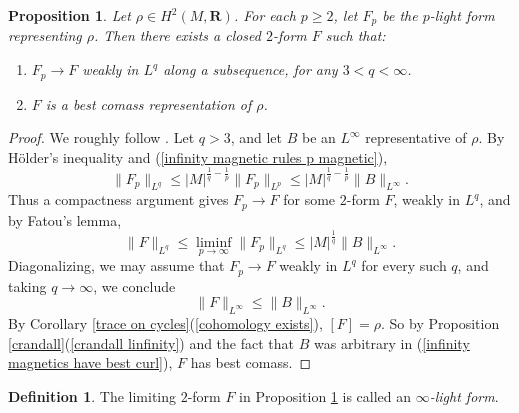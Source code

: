 \documentclass[reqno,11pt]{amsart}
\newcommand{\RR}{\mathbf{R}}
\newcommand{\dfn}[1]{\emph{#1}\index{#1}}
\newtheorem{proposition}[theorem]{Proposition}
\theoremstyle{definition}
\newtheorem{definition}[theorem]{Definition}
\numberwithin{equation}{section}
\begin{document}
\begin{proposition}\label{existence infinity}
Let $\rho \in H^2(M, \RR)$.
For each $p \geq 2$, let $F_p$ be the $p$-light form representing $\rho$. Then there exists a closed $2$-form $F$ such that:
\begin{enumerate}
\item $F_p \to F$ weakly in $L^q$ along a subsequence, for any $3 < q < \infty$.
\item $F$ is a best comass representation of $\rho$.
\end{enumerate}
\end{proposition}
\begin{proof}
We roughly follow \cite[\S3]{Lindqvist14}.
Let $q > 3$, and let $B$ be an $L^\infty$ representative of $\rho$.
By H\"older's inequality and (\ref{infinity magnetic rules p magnetic}),
\begin{equation}\label{uniform bounds in p by best curl}
	\|F_p\|_{L^q} \leq |M|^{\frac{1}{q} - \frac{1}{p}} \|F_p\|_{L^p} \leq |M|^{\frac{1}{q} - \frac{1}{p}} \|B\|_{L^\infty}.
\end{equation}
Thus a compactness argument gives $F_p \to F$ for some $2$-form $F$, weakly in $L^q$, and by Fatou's lemma, 
$$\|F\|_{L^q} \leq \liminf_{p \to \infty} \|F_p\|_{L^q} \leq |M|^{\frac{1}{q}} \|B\|_{L^\infty}.$$
Diagonalizing, we may assume that $F_p \to F$ weakly in $L^q$ for every such $q$, and taking $q \to \infty$, we conclude 
\begin{equation}\label{infinity magnetics have best curl}
	\|F\|_{L^\infty} \leq \|B\|_{L^\infty}.
\end{equation}
By Corollary \ref{trace on cycles}(\ref{cohomology exists}), $[F] = \rho$.
So by Proposition \ref{crandall}(\ref{crandall linfinity}) and the fact that $B$ was arbitrary in (\ref{infinity magnetics have best curl}), $F$ has best comass.
\end{proof}

\begin{definition}
The limiting $2$-form $F$ in Proposition \ref{existence infinity} is called an \dfn{$\infty$-light form}.
\end{definition}
\end{document}
